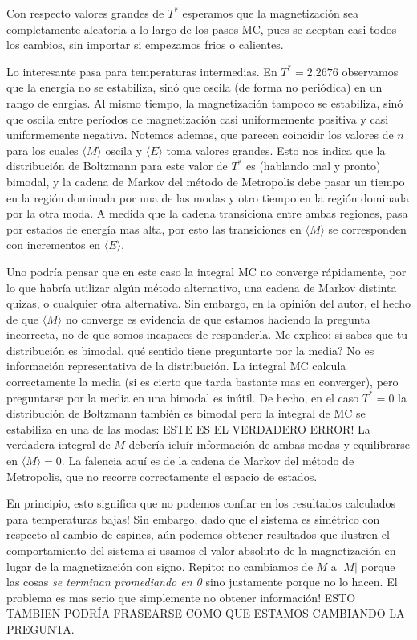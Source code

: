 \documentclass[a4paper,12pt]{article}
\begin{document}
Con respecto valores grandes de $T^*$ esperamos que la magnetización sea completamente aleatoria a lo largo de los pasos MC, pues se aceptan casi todos los cambios, sin importar si empezamos frios o calientes.

Lo interesante pasa para temperaturas intermedias. En $T^* = 2.2676$ observamos que la energía no se estabiliza, sinó que oscila (de forma no periódica) en un rango de enrgías. Al mismo tiempo, la magnetización tampoco se estabiliza, sinó que oscila entre períodos de magnetización casi uniformemente positiva y casi uniformemente negativa. Notemos ademas, que parecen coincidir los valores de $n$ para los cuales $\langle M \rangle$ oscila y $\langle E \rangle$ toma valores grandes. Esto nos indica que la distribución de Boltzmann para este valor de $T^*$ es (hablando mal y pronto) bimodal, y la cadena de Markov del método de Metropolis debe pasar un tiempo en la región dominada por una de las modas y otro tiempo en la región dominada por la otra moda. A medida que la cadena transiciona entre ambas regiones, pasa por estados de energía mas alta, por esto las transiciones en $\langle M \rangle$ se corresponden con incrementos en $\langle E \rangle$.

Uno podría pensar que en este caso la integral MC no converge rápidamente, por lo que habría utilizar algún método alternativo, una cadena de Markov distinta quizas, o cualquier otra alternativa. Sin embargo, en la opinión del autor, el hecho de que $\langle M \rangle$ no converge es evidencia de que estamos haciendo la pregunta incorrecta, no de que somos incapaces de responderla. Me explico: si sabes que tu distribución es bimodal, qué sentido tiene preguntarte por la media? No es información representativa de la distribución. La integral MC calcula correctamente la media (si es cierto que tarda bastante mas en converger), pero preguntarse por la media en una bimodal es inútil. De hecho, en el caso $T^* = 0$ la distribución de Boltzmann también es bimodal pero la integral de MC se estabiliza en una de las modas: ESTE ES EL VERDADERO ERROR! La verdadera integral de $M$ debería icluír información de ambas modas y equilibrarse en $\langle M \rangle = 0$. La falencia aquí es de la cadena de Markov del método de Metropolis, que no recorre correctamente el espacio de estados.

En principio, esto significa que no podemos confiar en los resultados calculados para temperaturas bajas! Sin embargo, dado que el sistema es simétrico con respecto al cambio de espines, aún podemos obtener resultados que ilustren el comportamiento del sistema si usamos el valor absoluto de la magnetización en lugar de la magnetización con signo. Repito: no cambiamos de $M$ a $|M|$ porque las cosas {\it se terminan promediando en 0} sino justamente porque no lo hacen. El problema es mas serio que simplemente no obtener información! ESTO TAMBIEN PODRÍA FRASEARSE COMO QUE ESTAMOS CAMBIANDO LA PREGUNTA.\\
\end{document}
